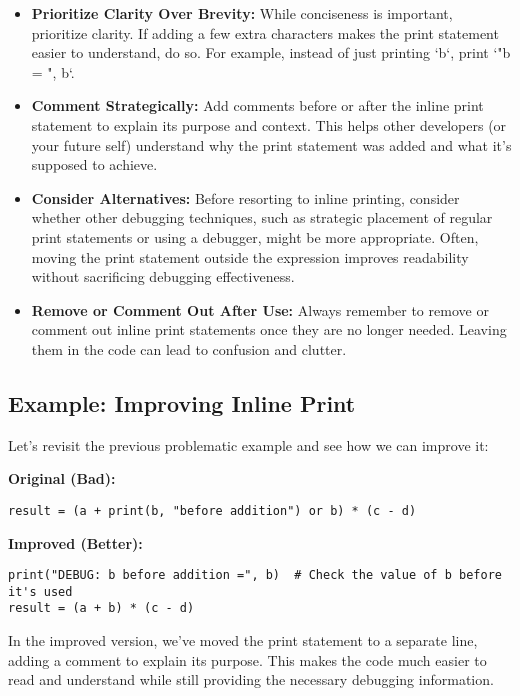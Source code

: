 \documentclass{article}
\begin{document}
{{{{\begin{itemize}
    \item \textbf{Prioritize Clarity Over Brevity:} While conciseness is important, prioritize clarity. If adding a few extra characters makes the print statement easier to understand, do so. For example, instead of just printing `b`, print `"b = ", b`.

    \item \textbf{Comment Strategically:}  Add comments before or after the inline print statement to explain its purpose and context. This helps other developers (or your future self) understand why the print statement was added and what it's supposed to achieve.

    \item \textbf{Consider Alternatives:} Before resorting to inline printing, consider whether other debugging techniques, such as strategic placement of regular print statements or using a debugger, might be more appropriate.  Often, moving the print statement outside the expression improves readability without sacrificing debugging effectiveness.

    \item \textbf{Remove or Comment Out After Use:} Always remember to remove or comment out inline print statements once they are no longer needed. Leaving them in the code can lead to confusion and clutter.
\end{itemize}

\subsection*{Example: Improving Inline Print}

Let's revisit the previous problematic example and see how we can improve it:

\textbf{Original (Bad):}

\begin{verbatim}
result = (a + print(b, "before addition") or b) * (c - d)
\end{verbatim}

\textbf{Improved (Better):}

\begin{verbatim}
print("DEBUG: b before addition =", b)  # Check the value of b before it's used
result = (a + b) * (c - d)
\end{verbatim}

In the improved version, we've moved the print statement to a separate line, adding a comment to explain its purpose. This makes the code much easier to read and understand while still providing the necessary debugging information.

}}}}
\end{document}
